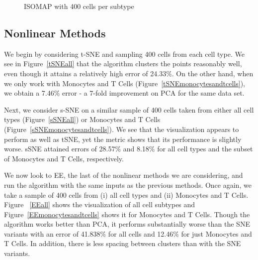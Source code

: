 \documentclass{article}
\begin{document}
\begin{figure}[h]
\vskip 0.2in
\begin{center}
\quad
{}\quad
\end{center}
\caption{ISOMAP with 400 cells per subtype}
\label{isomaps}
\vskip -0.2in
\end{figure}

\subsection{Nonlinear Methods}
We begin by considering t-SNE and sampling 400 cells from each cell type. We see in Figure~\ref{tSNEall} that the algorithm clusters the points reasonably well, even though it attains a relatively high error of 24.33\%. On the other hand, when we only work with Monocytes and T Cells (Figure~\ref{tSNEmonocytesandtcells}), we obtain a 7.46\% error - a 7-fold improvement on PCA for the same data set. 

Next, we consider s-SNE on a similar sample of 400 cells taken from either all cell types (Figure~\ref{sSNEall})  or  Monocytes and T Cells (Figure~\ref{sSNEmonocytesandtcells}). We see that the visualization appears to perform as well as tSNE, yet the metric shows that its performance is slightly worse. sSNE attained errors of 28.57\% and 8.18\% for all cell types and the subset of Monocytes and T Cells, respectively.  

We now look to EE, the last of the nonlinear methods we are considering, and run the algorithm with the same inputs as the previous methods. Once again, we take a sample of 400 cells from (i) all cell types and (ii) Monocytes and T Cells. Figure ~\ref{EEall} shows the visualization of all cell subtypes and Figure~\ref{EEmonocytesandtcells} shows it for Monocytes and T Cells. Though the algorithm works better than PCA, it performs substantially worse than the SNE variants with an error of 41.838\% for all cells and 12.46\% for just Monocytes and T Cells. In addition, there is less spacing between clusters than with the SNE variants.
\end{document}
